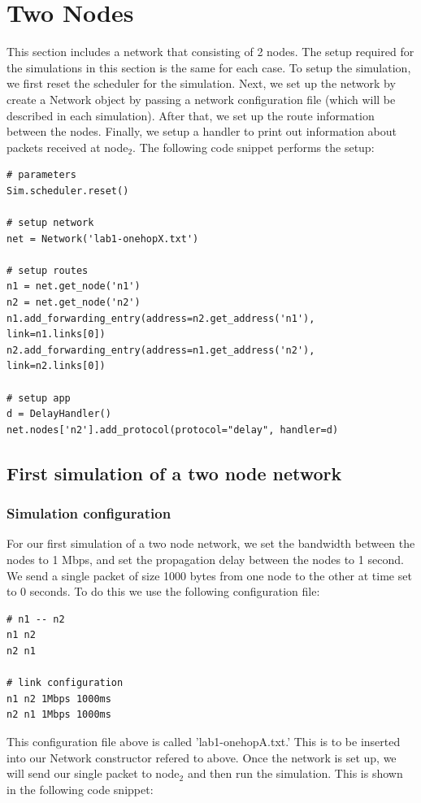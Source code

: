 \documentclass[fleqn,11pt]{article}
\begin{document}
\section{Two Nodes}
This section includes a network that consisting of 2 nodes. The setup required for the simulations in this section is the same for each case. To setup the simulation, we first reset the scheduler for the simulation. Next, we set up the network by create a Network object by passing a network configuration file (which will be described in each simulation). After that, we set up the route information between the nodes. Finally, we setup a handler to print out information about packets received at node$_2$. The following code snippet performs the setup:
\begin{lstlisting}
# parameters
Sim.scheduler.reset()

# setup network
net = Network('lab1-onehopX.txt')

# setup routes
n1 = net.get_node('n1')
n2 = net.get_node('n2')
n1.add_forwarding_entry(address=n2.get_address('n1'), link=n1.links[0])
n2.add_forwarding_entry(address=n1.get_address('n2'), link=n2.links[0])

# setup app
d = DelayHandler()
net.nodes['n2'].add_protocol(protocol="delay", handler=d)
\end{lstlisting}

 \subsection{First simulation of a two node network}
\subsubsection{Simulation configuration}
For our first simulation of a two node network, we set the bandwidth between the nodes to 1 Mbps, and set the propagation delay between the nodes to 1 second. We send a single packet of size 1000 bytes from one node to the other at time set to 0 seconds. To do this we use the following configuration file:

\begin{lstlisting}
# n1 -- n2
n1 n2
n2 n1

# link configuration
n1 n2 1Mbps 1000ms
n2 n1 1Mbps 1000ms
\end{lstlisting}

This configuration file above is called 'lab1-onehopA.txt.' This is to be inserted into our Network constructor refered to above.
Once the network is set up, we will send our single packet to node$_2$ and then run the simulation. This is shown in the following code snippet:    
\end{document}

